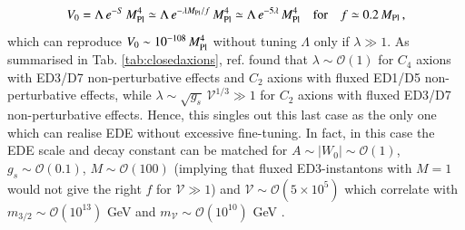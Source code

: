 \begin{equation}
V_0 = \Lambda\,e^{-S}\,M_{\rm Pl}^4 \simeq \Lambda\,e^{- \lambda M_{\rm Pl}/f}\,M_{\rm Pl}^4 \simeq \Lambda\,e^{- 5 \lambda}\,M_{\rm Pl}^4\quad \text{for}\quad f \simeq 0.2\,M_{\rm Pl}\,,
\label{KeyRel}
\end{equation}
which can reproduce $V_0 \sim 10^{-108}\,M_{\rm Pl}^4$ without tuning $\Lambda$ only if $\lambda \gg 1$. As summarised in Tab. \ref{tab:closedaxions}, ref. \cite{Cicoli:2021gss} found that $\lambda\sim\mathcal{O}(1)$ for $C_4$ axions with ED3/D7 non-perturbative effects and $C_2$ axions with fluxed ED1/D5 non-perturbative effects, while $\lambda\sim \sqrt{g_s}\,\mathcal{V}^{1/3}\gg 1$ for $C_2$ axions with fluxed ED3/D7 non-perturbative effects. Hence, this singles out this last case as the only one which can realise EDE without excessive fine-tuning. In fact, in this case the EDE scale and decay constant can be matched for $A\sim |W_0|\sim\mathcal{O}(1)$, $g_s\sim\mathcal{O}(0.1)$, $M\sim \mathcal{O}(100)$ (implying that fluxed ED3-instantons with $M=1$ would not give the right $f$ for $\mathcal{V}\gg 1$) and $\mathcal{V}\sim \mathcal{O}(5\times 10^5)$ which correlate with $m_{3/2}\sim\mathcal{O}(10^{13})$ GeV and $m_{\mathcal{V}}\sim \mathcal{O}(10^{10})$ GeV \cite{Cicoli:2023qri}.

\enddocument


\newpage